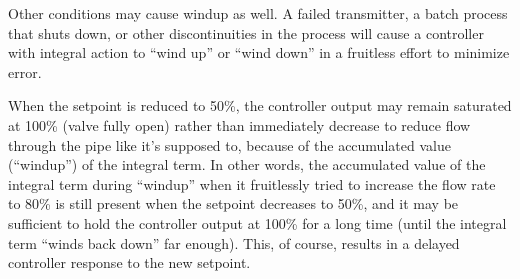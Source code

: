 





Other conditions may cause windup as well.  A failed transmitter, a batch process that shuts down, or other discontinuities in the process will cause a controller with integral action to ``wind up'' or ``wind down'' in a fruitless effort to minimize error.

When the setpoint is reduced to 50\%, the controller output may remain saturated at 100\% (valve fully open) rather than immediately decrease to reduce flow through the pipe like it's supposed to, because of the accumulated value (``windup'') of the integral term.  In other words, the accumulated value of the integral term during ``windup'' when it fruitlessly tried to increase the flow rate to 80\% is still present when the setpoint decreases to 50\%, and it may be sufficient to hold the controller output at 100\% for a long time (until the integral term ``winds back down'' far enough).  This, of course, results in a delayed controller response to the new setpoint.




